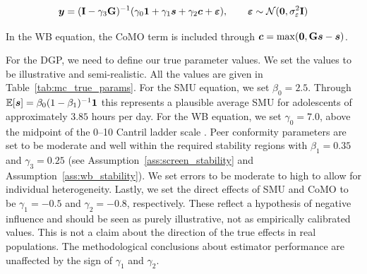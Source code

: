 \begin{equation}
    \bm{y} = (\mathbf{I} - \gamma_3\mathbf{G})^{-1}(\gamma_0\bm{1} + \gamma_1\bm{s} + \gamma_2\bm{c} + \bm{\varepsilon}), \qquad \bm{\varepsilon} \sim \mathcal{N}(\bm{0}, \sigma_\varepsilon^2\mathbf{I})
\end{equation}

In the WB equation, the CoMO term is included through $\bm{c} = \max(\bm{0}, \mathbf{G}\bm{s} - \bm{s})$.

For the DGP, we need to define our true parameter values. We set the values to be illustrative and semi-realistic. All the values are given in Table~\ref{tab:mc_true_params}. For the SMU equation, we set $\beta_0 = 2.5$. Through $\mathbb{E}[\bm{s}] = \beta_0(1 - \beta_1)^{-1}\bm{1}$ this represents a plausible average SMU for adolescents of approximately $3.85$ hours per day. For the WB equation, we set $\gamma_0 = 7.0$, above the midpoint of the 0--10 Cantril ladder scale \parencite[p.~22]{Cantril1965}. Peer conformity parameters are set to be moderate and well within the required stability regions with $\beta_1 = 0.35$ and $\gamma_3 = 0.25$ (see Assumption~\ref{ass:screen_stability} and Assumption~\ref{ass:wb_stability}). We set errors to be moderate to high to allow for individual heterogeneity. Lastly, we set the direct effects of SMU and CoMO to be $\gamma_1 = -0.5$ and $\gamma_2 = -0.8$, respectively. These reflect a hypothesis of negative influence and should be seen as purely illustrative, not as empirically calibrated values. This is not a claim about the direction of the true effects in real populations. The methodological conclusions about estimator performance are unaffected by the sign of $\gamma_1$ and $\gamma_2$.

